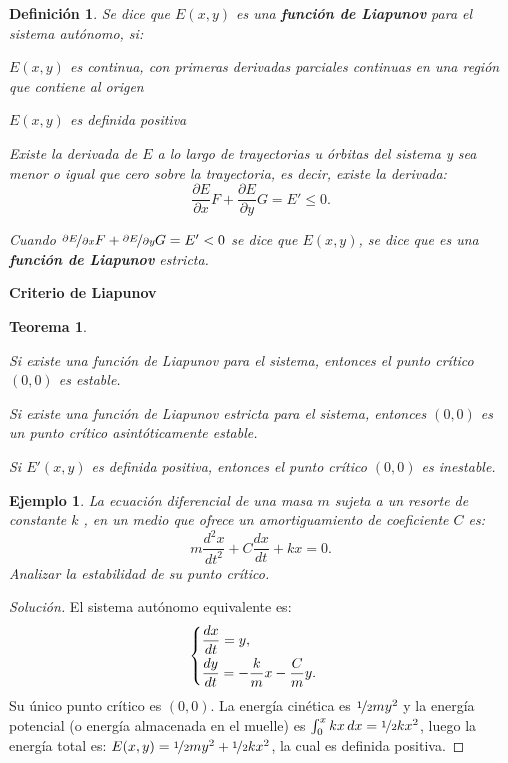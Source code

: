 \documentclass[a5paper,doc,10pt,noapacite]{apa6}
\newtheorem{definicion}{Definición}
\newtheorem{teorema}{Teorema}
\newtheorem{ejem}{Ejemplo}
\newcommand{\neodefi}[1]{%
	\vspace{1\baselineskip}
	\textbf{\small#1} \newline
}
\begin{document}
{{\begin{definicion}
	Se dice que \(E(x,y)\) es una \emph{\textbf{función de Liapunov}} para el sistema autónomo, si:
	\begin{APAitemize}
		\item \(E(x,y)\) es continua, con primeras derivadas parciales continuas en una región que contiene al 	origen
		\item \(E(x,y)\) es definida positiva
		\item Existe la derivada de \(E\) a lo largo de trayectorias u órbitas del sistema y sea menor o igual que cero sobre la trayectoria, es decir, existe la derivada:
		\[
		\dfrac{\partial E}{\partial x}F+\dfrac{\partial E}{\partial y}G=E'\leq 0.
		\]
		\item Cuando \(\nicefrac{\partial E}{\partial x}F+\nicefrac{\partial E}{\partial y}G=E'<0\) se dice que \(E(x,y)\), se dice que es una \emph{\textbf{función de Liapunov}}	estricta.
	\end{APAitemize}
\end{definicion}


\neodefi{Criterio de Liapunov}

\begin{teorema}\quad
	\begin{APAenumerate}
		\item Si existe una función de Liapunov para el sistema, entonces el punto crítico \(( 0 , 0 )\) es estable.
		\item Si existe una función de Liapunov estricta para el sistema, entonces \((0,0)\) es un punto crítico asintóticamente estable.
		\item Si \(E'(x,y)\) es definida positiva, entonces el punto crítico \((0,0)\) es inestable.
	\end{APAenumerate}
\end{teorema}

\begin{ejem}
	La ecuación diferencial de una masa \(m\) sujeta a un resorte de constante \(k\) , en un medio que ofrece un amortiguamiento de coeficiente \(C\) es:
	\[
	m\dfrac{d^2x}{dt^2}+C\dfrac{dx}{dt}+kx=0.
	\]
	Analizar la estabilidad de su punto crítico.
\end{ejem}
\begin{proof}[Solución]
		El sistema autónomo equivalente es:
		\[
		\begin{cases}
		\dfrac{dx}{dt}=y,\vspace{0.3em}
		\\
		\dfrac{dy}{dt}=-\dfrac{k}{m}x-\dfrac{C}{m}y.
	\end{cases}
		\]
		Su único punto crítico es \((0,0)\). La energía cinética es \(\nicefrac{1}{2}my^2\) y la energía potencial (o energía almacenada en el muelle) es \(\int_{0}^{x}kx\,dx=\nicefrac{1}{2}kx^2\), luego la energía total es: \(E(x,y)=\nicefrac{1}{2}my^2+\nicefrac{1}{2}kx^2\), la cual es definida positiva.
		

\end{proof}}}
\end{document}
